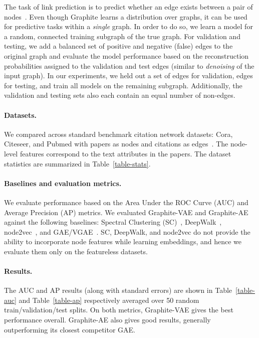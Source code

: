 \documentclass{article}
\newcommand{\name}{Graphite}
\begin{document}
The task of link prediction is to predict whether an edge exists between a pair of nodes~\citep{loehlin1998latent}. Even though \name{} learns a distribution over graphs, it can be used for predictive tasks within a \textit{single} graph. In order to do so, we learn a model for a random, connected training subgraph of the true graph. For validation and testing, we add a balanced set of positive and negative (false) edges to the original graph and evaluate the model performance based on the reconstruction probabilities assigned to the validation and test edges (similar to \textit{denoising} of the input graph). In our experiments, we held out a set of  edges for validation,  edges for testing, and train all models on the remaining subgraph. Additionally, the validation and testing sets also each contain an equal number of non-edges.

 \paragraph{Datasets.} We compared across standard benchmark citation network datasets: Cora, Citeseer, and Pubmed with papers as nodes and citations as edges~\citep{sen2008networks}. 
 The node-level features correspond to the text attributes in the papers.
The dataset statistics are summarized in Table~\ref{table-stats}.

\paragraph{Baselines and evaluation metrics.} We evaluate performance based on the Area Under the ROC Curve (AUC) and Average Precision (AP) metrics. We evaluated \name{}-VAE and \name{}-AE against the following baselines: Spectral Clustering (SC)~\citep{tang2011leveraging}, DeepWalk~\citep{perozzi2014deepwalk}, node2vec~\citep{grover2016node2vec}, and GAE/VGAE~\citep{kipf2016variational}. SC, DeepWalk, and node2vec do not provide the ability to incorporate node features while learning embeddings, and hence we evaluate them only on the featureless datasets. 



\paragraph{Results.} The AUC and AP results (along with standard errors) are shown in Table~\ref{table-auc} and Table~\ref{table-ap} respectively averaged over 50 random train/validation/test splits. 
On both metrics, \name{}-VAE gives the best performance overall. \name{}-AE also gives good results, generally outperforming its closest competitor GAE.  
\end{document}

